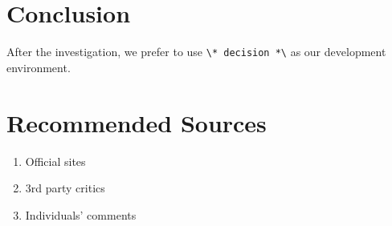 \documentclass{ctexart}
\begin{document}
	\section{Conclusion}
	After the investigation, we prefer to use \verb|\* decision *\| as our development environment.
	\newpage\appendix
	\section{Recommended Sources}
	\begin{enumerate}
		\item Official sites
		\item 3rd party critics
		\item Individuals' comments
	\end{enumerate}
\end{document}
